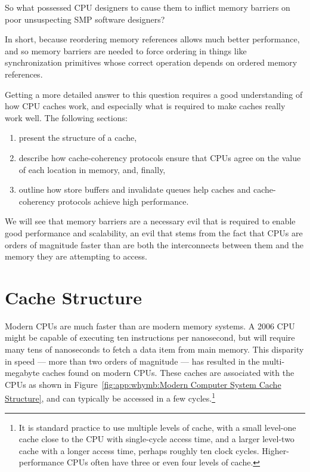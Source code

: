 

So what possessed CPU designers to cause them to inflict memory barriers
on poor unsuspecting SMP software designers?

In short, because reordering memory references allows much better performance,
and so memory barriers are needed to force ordering in things like
synchronization primitives whose correct operation depends on ordered
memory references.

Getting a more detailed answer to this question requires a good understanding
of how CPU caches work, and especially what is required to make
caches really work well.
The following sections:
\begin{enumerate}
\item	present the structure of a cache,
\item	describe how cache-coherency protocols ensure that CPUs agree
	on the value of each location in memory, and, finally,
\item	outline how store buffers and invalidate queues help
	caches and cache-coherency protocols achieve high performance.
\end{enumerate}
We will see that memory barriers are a necessary evil that is required
to enable good performance and scalability, an evil that stems from
the fact that CPUs are orders of magnitude faster than are both the
interconnects between them and the memory they are attempting to access.

\section{Cache Structure}
\label{sec:app:whymb:Cache Structure}

Modern CPUs are much faster than are modern memory systems.
A 2006 CPU might be capable of executing ten instructions per nanosecond,
but will require many tens of nanoseconds to fetch a data item from
main memory.
This disparity in speed --- more than two orders of magnitude --- has
resulted in the multi-megabyte caches found on modern CPUs.
These caches are associated with the CPUs as shown in
Figure~\ref{fig:app:whymb:Modern Computer System Cache Structure},
and can typically be accessed in a few cycles.\footnote{
	It is standard practice to use multiple levels of cache,
	with a small level-one cache close to the CPU with
	single-cycle access time, and a larger level-two cache
	with a longer access time, perhaps roughly ten clock cycles.
	Higher-performance CPUs often have three or even four levels
	of cache.}

